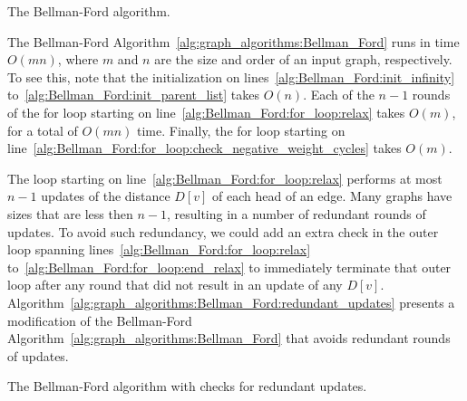\begin{algorithm}[!htpb]

\caption{The Bellman-Ford algorithm.}
\label{alg:graph_algorithms:Bellman_Ford}
\end{algorithm}

The Bellman-Ford Algorithm~\ref{alg:graph_algorithms:Bellman_Ford}
runs in time $O(mn)$, where $m$ and $n$ are the size and order of an
input graph, respectively. To see this, note that the initialization
on lines~\ref{alg:Bellman_Ford:init_infinity}
to~\ref{alg:Bellman_Ford:init_parent_list} takes $O(n)$. Each of the
$n - 1$ rounds of the for loop starting on
line~\ref{alg:Bellman_Ford:for_loop:relax} takes $O(m)$, for a total
of $O(mn)$ time. Finally, the for loop starting on
line~\ref{alg:Bellman_Ford:for_loop:check_negative_weight_cycles}
takes $O(m)$.

The loop starting on line~\ref{alg:Bellman_Ford:for_loop:relax}
performs at most $n - 1$ updates of the distance
$D[v]$ of each head of an edge. Many graphs have sizes that are less
then $n - 1$, resulting in a number of redundant rounds of updates. To
avoid such redundancy, we could add an extra check in the outer loop
spanning lines~\ref{alg:Bellman_Ford:for_loop:relax}
to~\ref{alg:Bellman_Ford:for_loop:end_relax} to immediately terminate
that outer loop after any round that did not result in an update of
any $D[v]$.
Algorithm~\ref{alg:graph_algorithms:Bellman_Ford:redundant_updates}
presents a modification of the Bellman-Ford
Algorithm~\ref{alg:graph_algorithms:Bellman_Ford} that avoids
redundant rounds of updates.

\begin{algorithm}[!htpb]

\caption{The Bellman-Ford algorithm with checks for redundant updates.}
\label{alg:graph_algorithms:Bellman_Ford:redundant_updates}
\end{algorithm}



